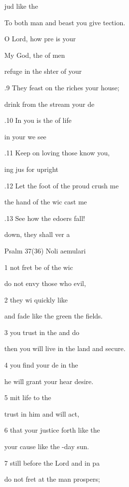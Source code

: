  jud like the  

To both man and beast you give tection. 

 O Lord, how pre is your  

My God, the  of men 

 refuge in the shter of your  

.9 They feast on the riches  your house; 

 drink from the stream  your de 

.10 In you is the  of life 

 in your  we see  

.11 Keep on loving those  know you, 

ing jus for upright  

.12 Let the foot of the proud  crush me 

 the hand of the wic cast me  

.13 See how the edoers fall! 

 down, they shall ver a 

Psalm 37(36) Noli aemulari 


1  not fret be of the wic 

do not envy those who  evil, 

2  they wi quickly like  

and fade like the green  the fields. 

3  you trust in the  and do  

then you will live in the land and  secure. 

4  you find your de in the  

he will grant your hear desire. 

5 mit  life to the  

trust in him and  will act, 

6  that your justice  forth like the  

your cause like the -day sun. 

7  still before the Lord and  in pa 

do not fret at the man  prospers; 

